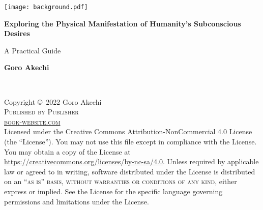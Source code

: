 \documentclass[
	11pt, %
	fleqn, %
	a4paper, %
]{LegrandOrangeBook}
\begin{document}

\titlepage %
	{\texttt{[image: background.pdf]}} %
	{ %
		\centering\sffamily %
		{\Huge\bfseries Exploring the Physical Manifestation of Humanity's Subconscious Desires\par} %
		\vspace{16pt} %
		{\LARGE A Practical Guide\par} %
		\vspace{24pt} %
		{\huge\bfseries Goro Akechi\par} %
	}


\thispagestyle{empty} %

~\vfill %

\noindent Copyright \copyright\ 2022 Goro Akechi\\ %

\noindent \textsc{Published by Publisher}\\ %

\noindent \textsc{\href{https://www.latextemplates.com/template/legrand-orange-book}{book-website.com}}\\ %

\noindent Licensed under the Creative Commons Attribution-NonCommercial 4.0 License (the ``License''). You may not use this file except in compliance with the License. You may obtain a copy of the License at \url{https://creativecommons.org/licenses/by-nc-sa/4.0}. Unless required by applicable law or agreed to in writing, software distributed under the License is distributed on an \textsc{``as is'' basis, without warranties or conditions of any kind}, either express or implied. See the License for the specific language governing permissions and limitations under the License.\\ %
\end{document}
